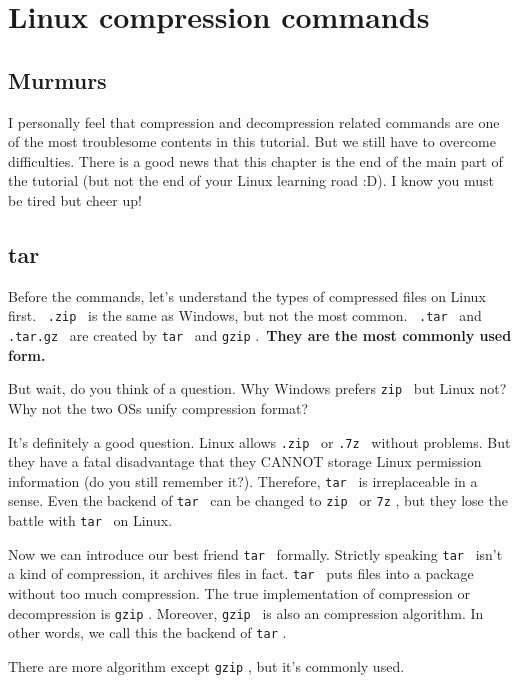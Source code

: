 \documentclass[lang=en,color=blue,12pt]{elegantbook}
\let\oldtexttt\texttt
\renewcommand{\texttt}[1]{%
  \begingroup
  \setlength{\fboxsep}{1pt}%
  \colorbox{gray!10}{\oldtexttt{#1}}%
  \endgroup
}
\begin{document}
\section{\textbf{Linux compression commands}}

\subsection{\textbf{Murmurs}}

I personally feel that compression and decompression related commands
are one of the most troublesome contents in this tutorial. But we still
have to overcome difficulties. There is a good news that this chapter is
the end of the main part of the tutorial (but not the end of your Linux
learning road :D). I know you must be tired but cheer up!

\subsection{\textbf{tar}}

Before the commands, let's understand the types of
compressed files on Linux first.\ \texttt{.zip}\ is the same as Windows,
but not the most common.\ \texttt{.tar}\ and \texttt{.tar.gz}\ are created
by \texttt{tar}\ and \texttt{gzip}.\ \textbf{They are the most commonly
used form.}

But wait, do you think of a question. Why Windows prefers \texttt{zip}\
but Linux not? Why not the two OSs unify compression format?

It's definitely a good question. Linux allows
\texttt{.zip}\ or \texttt{.7z}\ without problems. But they have a fatal
disadvantage that they CANNOT storage Linux permission information (do
you still remember it?). Therefore, \texttt{tar}\ is irreplaceable in a
sense. Even the backend of \texttt{tar}\ can be changed to \texttt{zip}\
or \texttt{7z}, but they lose the battle with \texttt{tar}\ on Linux.

Now we can introduce our best friend \texttt{tar}\ formally. Strictly
speaking \texttt{tar}\ isn't a kind of compression, it
archives files in fact. \texttt{tar}\ puts files into a package without
too much compression. The true implementation of compression or
decompression is \texttt{gzip}. Moreover, \texttt{gzip}\ is also an
compression algorithm. In other words, we call this the backend of
\texttt{tar}.

\begin{note}
There are more algorithm except \texttt{gzip}, but it's
commonly used.
\end{note}
\end{document}
